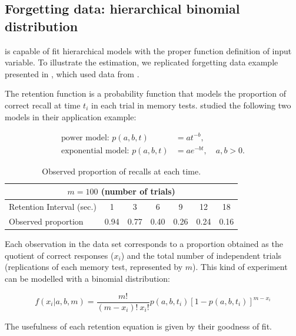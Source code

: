 \documentclass[nojss]{jss}
\begin{document}
\subsection{Forgetting data: hierarchical binomial distribution}

 is capable of fit hierarchical models with the proper function definition of input variable. To illustrate the estimation, we replicated forgetting data example presented in \cite{Myung2003}, which used data from \cite{MurdockBennetB.1961}.

The retention function is a probability function that models the proportion of correct recall at time $t_i$ in each trial in memory tests. \cite{Myung2003} studied the following two models in their application example:

\begin{equation}\label{priors}
  \begin{split}
    \text{power model: }p(a, b, t) & = at^{-b}, \\
    \text{exponential model: }p(a, b, t) & = ae^{-b t}, \quad a, b > 0.
  \end{split}
\end{equation}

\begin{table}[h!]
\centering
\begin{tabular}{|l|cccccc|}
\hline
\multicolumn{7}{|c|}{$m=100$ (number of trials)}                      \\ \hline
Retention Interval (sec.) & 1    & 3    & 6    & 9    & 12   & 18   \\ \hline
Observed proportion       & 0.94 & 0.77 & 0.40 & 0.26 & 0.24 & 0.16 \\ \hline
\end{tabular}
\caption{Observed proportion of recalls at each time.}
\end{table}

Each observation in the data set corresponds to a proportion obtained as the quotient of correct responses ($x_i$) and the total number of independent trials (replications of each memory test, represented by $m$). This kind of experiment can be modelled with a binomial distribution:

\begin{equation} \label{posterior}
  f(x_i|a, b, m) = \frac{m!}{(m-x_i)!\: x_i!}p(a, b, t_i) \left[ 1-p(a, b, t_i) \right]^{m-x_i}
\end{equation}

The usefulness of each retention equation is given by their goodness of fit.
\end{document}
